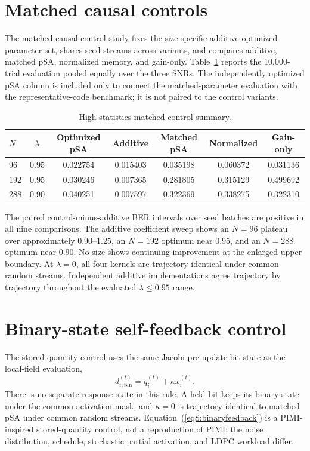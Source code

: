 \documentclass[aps,prapplied,preprint,superscriptaddress,longbibliography,floatfix]{revtex4-2}
\newcommand{\psa}{pSA}
\begin{document}
\section{Matched causal controls}

The matched causal-control study fixes the size-specific additive-optimized parameter set, shares seed streams across variants, and compares additive, matched \psa{}, normalized memory, and gain-only.  Table~\ref{tabS:controls} reports the 10,000-trial evaluation pooled equally over the three SNRs.  The independently optimized \psa{} column is included only to connect the matched-parameter evaluation with the representative-code benchmark; it is not paired to the control variants.

\begin{table}[ht]
\caption{High-statistics matched-control summary.}
\label{tabS:controls}
\begin{ruledtabular}
\begin{tabular}{lcccccc}
$N$ & $\lambda$ & Optimized \psa{} & Additive & Matched \psa{} & Normalized & Gain-only \\
\hline
96  & 0.95 & 0.022754 & 0.015403 & 0.035198 & 0.060372 & 0.031136 \\
192 & 0.95 & 0.030246 & 0.007365 & 0.281805 & 0.315129 & 0.499692 \\
288 & 0.90 & 0.040251 & 0.007597 & 0.322369 & 0.338275 & 0.322310 \\
\end{tabular}
\end{ruledtabular}
\end{table}

The paired control-minus-additive BER intervals over seed batches are positive in all nine comparisons.  The additive coefficient sweep shows an $N=96$ plateau over approximately 0.90--1.25, an $N=192$ optimum near 0.95, and an $N=288$ optimum near 0.90.  No size shows continuing improvement at the enlarged upper boundary.  At $\lambda=0$, all four kernels are trajectory-identical under common random streams.  Independent additive implementations agree trajectory by trajectory throughout the evaluated $\lambda\leq0.95$ range.

\section{Binary-state self-feedback control}

The stored-quantity control uses the same Jacobi pre-update bit state as the local-field evaluation,
\begin{equation}
d_{i,\mathrm{bin}}^{(t)}=q_i^{(t)}+\kappa x_i^{(t)}.
\label{eqS:binaryfeedback}
\end{equation}
There is no separate response state in this rule.  A held bit keeps its binary state under the common activation mask, and $\kappa=0$ is trajectory-identical to matched \psa{} under common random streams.  Equation~(\ref{eqS:binaryfeedback}) is a PIMI-inspired stored-quantity control, not a reproduction of PIMI: the noise distribution, schedule, stochastic partial activation, and LDPC workload differ.
\end{document}
